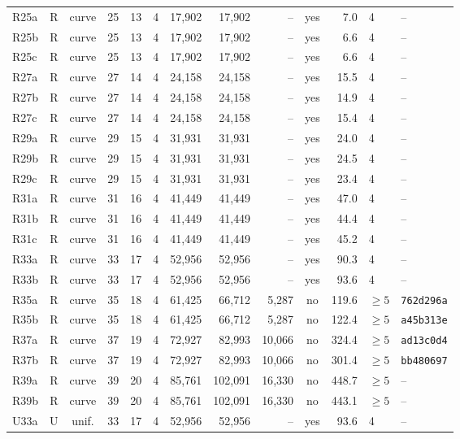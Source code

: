 \begin{tabular}{@{}lccrrrrrrcrll@{}}
R25a & R & curve & 25 & 13 & 4 & 17{,}902 & 17{,}902 & -- & yes & 7.0 & 4 & -- \\
R25b & R & curve & 25 & 13 & 4 & 17{,}902 & 17{,}902 & -- & yes & 6.6 & 4 & -- \\
R25c & R & curve & 25 & 13 & 4 & 17{,}902 & 17{,}902 & -- & yes & 6.6 & 4 & -- \\
R27a & R & curve & 27 & 14 & 4 & 24{,}158 & 24{,}158 & -- & yes & 15.5 & 4 & -- \\
R27b & R & curve & 27 & 14 & 4 & 24{,}158 & 24{,}158 & -- & yes & 14.9 & 4 & -- \\
R27c & R & curve & 27 & 14 & 4 & 24{,}158 & 24{,}158 & -- & yes & 15.4 & 4 & -- \\
R29a & R & curve & 29 & 15 & 4 & 31{,}931 & 31{,}931 & -- & yes & 24.0 & 4 & -- \\
R29b & R & curve & 29 & 15 & 4 & 31{,}931 & 31{,}931 & -- & yes & 24.5 & 4 & -- \\
R29c & R & curve & 29 & 15 & 4 & 31{,}931 & 31{,}931 & -- & yes & 23.4 & 4 & -- \\
R31a & R & curve & 31 & 16 & 4 & 41{,}449 & 41{,}449 & -- & yes & 47.0 & 4 & -- \\
R31b & R & curve & 31 & 16 & 4 & 41{,}449 & 41{,}449 & -- & yes & 44.4 & 4 & -- \\
R31c & R & curve & 31 & 16 & 4 & 41{,}449 & 41{,}449 & -- & yes & 45.2 & 4 & -- \\
R33a & R & curve & 33 & 17 & 4 & 52{,}956 & 52{,}956 & -- & yes & 90.3 & 4 & -- \\
R33b & R & curve & 33 & 17 & 4 & 52{,}956 & 52{,}956 & -- & yes & 93.6 & 4 & -- \\
R35a & R & curve & 35 & 18 & 4 & 61{,}425 & 66{,}712 & 5{,}287 & no & 119.6 & $\ge5$ & \texttt{762d296a} \\
R35b & R & curve & 35 & 18 & 4 & 61{,}425 & 66{,}712 & 5{,}287 & no & 122.4 & $\ge5$ & \texttt{a45b313e} \\
R37a & R & curve & 37 & 19 & 4 & 72{,}927 & 82{,}993 & 10{,}066 & no & 324.4 & $\ge5$ & \texttt{ad13c0d4} \\
R37b & R & curve & 37 & 19 & 4 & 72{,}927 & 82{,}993 & 10{,}066 & no & 301.4 & $\ge5$ & \texttt{bb480697} \\
R39a & R & curve & 39 & 20 & 4 & 85{,}761 & 102{,}091 & 16{,}330 & no & 448.7 & $\ge5$ & -- \\
R39b & R & curve & 39 & 20 & 4 & 85{,}761 & 102{,}091 & 16{,}330 & no & 443.1 & $\ge5$ & -- \\
\addlinespace
U33a & U & unif. & 33 & 17 & 4 & 52{,}956 & 52{,}956 & -- & yes & 93.6 & 4 & -- \\

\end{tabular}
